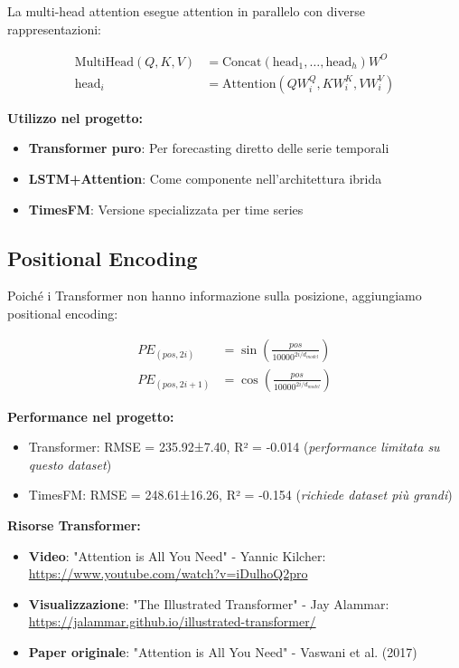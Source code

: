 \documentclass[12pt,a4paper,twoside]{report}
\begin{document}
La multi-head attention esegue attention in parallelo con diverse rappresentazioni:

\begin{align}
\text{MultiHead}(Q, K, V) &= \text{Concat}(\text{head}_1, \ldots, \text{head}_h)W^O \\
\text{head}_i &= \text{Attention}(QW_i^Q, KW_i^K, VW_i^V)
\end{align}

\textbf{Utilizzo nel progetto:}
\begin{itemize}
    \item \textbf{Transformer puro}: Per forecasting diretto delle serie temporali
    \item \textbf{LSTM+Attention}: Come componente nell'architettura ibrida
    \item \textbf{TimesFM}: Versione specializzata per time series
\end{itemize}

\subsection{Positional Encoding}

Poiché i Transformer non hanno informazione sulla posizione, aggiungiamo positional encoding:

\begin{align}
PE_{(pos, 2i)} &= \sin\left(\frac{pos}{10000^{2i/d_{model}}}\right) \\
PE_{(pos, 2i+1)} &= \cos\left(\frac{pos}{10000^{2i/d_{model}}}\right)
\end{align}

\textbf{Performance nel progetto:}
\begin{itemize}
    \item Transformer: RMSE = 235.92±7.40, R² = -0.014 (\textit{performance limitata su questo dataset})
    \item TimesFM: RMSE = 248.61±16.26, R² = -0.154 (\textit{richiede dataset più grandi})
\end{itemize}

\textbf{Risorse Transformer:}
\begin{itemize}
    \item \textbf{Video}: "Attention is All You Need" - Yannic Kilcher: \url{https://www.youtube.com/watch?v=iDulhoQ2pro}
    \item \textbf{Visualizzazione}: "The Illustrated Transformer" - Jay Alammar: \url{https://jalammar.github.io/illustrated-transformer/}
    \item \textbf{Paper originale}: "Attention is All You Need" - Vaswani et al. (2017)
\end{itemize}
\end{document}
